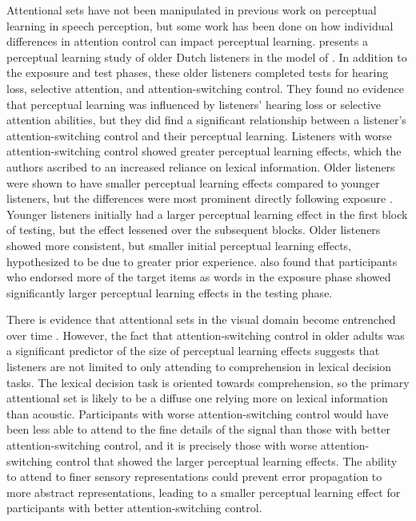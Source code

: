 Attentional sets have not been manipulated in previous work on perceptual learning in speech perception, but some work has been done on how individual differences in attention control can impact perceptual learning.
\citet{Scharenborg2014} presents a perceptual learning study of older Dutch listeners in the model of \citet{Norris2003}.  
In addition to the exposure and test phases, these older listeners completed tests for hearing loss, selective attention, and attention-switching control.  
They found no evidence that perceptual learning was influenced by listeners' hearing loss or selective attention abilities, but they did find a significant relationship between a listener's attention-switching control and their perceptual learning.  
Listeners with worse attention-switching control showed greater perceptual learning effects, which the authors ascribed to an increased reliance on lexical information.  
Older listeners were shown to have smaller perceptual learning effects compared to younger listeners, but the differences were most prominent directly following exposure \citep{Scharenborg2013}.  
Younger listeners initially had a larger perceptual learning effect in the first block of testing, but the effect lessened over the subsequent blocks.  
Older listeners showed more consistent, but smaller initial perceptual learning effects, hypothesized to be due to greater prior experience.  
\citet{Scharenborg2013} also found that participants who endorsed more of the target items as words in the exposure phase showed significantly larger perceptual learning effects in the testing phase.

There is evidence that attentional sets in the visual domain become entrenched over time \citep{Leber2006}.
However, the fact that attention-switching control in older adults was a significant predictor of the size of perceptual learning effects \citep{Scharenborg2014} suggests that listeners are not limited to only attending to comprehension in lexical decision tasks.
The lexical decision task is oriented towards comprehension, so the primary attentional set is likely to be a diffuse one relying more on lexical information than acoustic.
Participants with worse attention-switching control would have been less able to attend to the fine details of the signal than those with better attention-switching control, and it is precisely those with worse attention-switching control that showed the larger perceptual learning effects.
The ability to attend to finer sensory representations could prevent error propagation to more abstract representations, leading to a smaller perceptual learning effect for participants with better attention-switching control.

